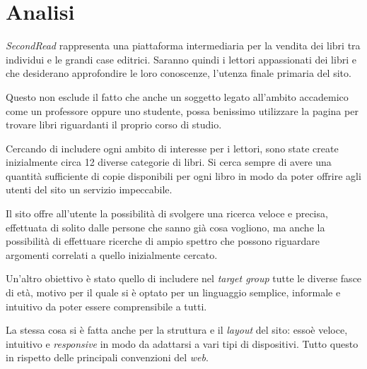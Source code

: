 \section{Analisi}
\textit{SecondRead} rappresenta una piattaforma intermediaria per la vendita dei libri tra individui e le grandi case editrici. Saranno quindi i lettori appassionati dei libri e che desiderano approfondire le loro conoscenze, l’utenza finale primaria del sito.

Questo non esclude il fatto che anche un soggetto legato all’ambito accademico come un professore oppure uno studente, possa benissimo utilizzare la pagina per trovare libri riguardanti il proprio corso di studio.

Cercando di includere ogni ambito di interesse per i lettori, sono state create inizialmente circa 12 diverse categorie di libri. Si cerca sempre di avere una quantità sufficiente di copie disponibili per ogni libro in modo da poter offrire agli utenti del sito un servizio impeccabile.

Il sito offre all’utente la possibilità di svolgere una ricerca veloce e precisa, effettuata di solito dalle persone che sanno già cosa vogliono, ma anche la possibilità di effettuare ricerche di ampio spettro che possono riguardare argomenti correlati a quello inizialmente cercato.

Un’altro obiettivo è stato quello di includere nel \textit{target group} tutte le diverse fasce di età, motivo per il quale si è optato per un linguaggio semplice, informale e intuitivo da poter essere comprensibile a tutti.

La stessa cosa si è fatta anche per la struttura e il \textit{layout} del sito: essoè  veloce, intuitivo e \textit{responsive} in modo da adattarsi a vari tipi di dispositivi. Tutto questo in rispetto delle principali convenzioni del \textit{web}.

